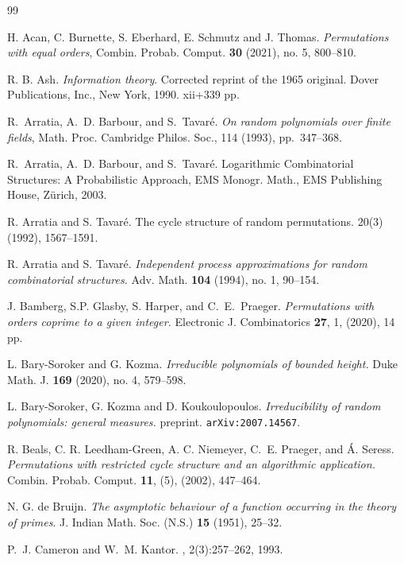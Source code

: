 \documentclass[10pt]{article}
\renewcommand{\(}{\left(}
\renewcommand{\)}{\right)}
\begin{document}
\begin{thebibliography}{99}

{\sc H. Acan, C. Burnette, S. Eberhard, E. Schmutz and J. Thomas}.
\emph{Permutations with equal orders},
Combin. Probab. Comput. {\bf 30} (2021), no. 5, 800--810. 
%

  {\sc R. B. Ash}. \emph{Information theory}.
  Corrected reprint of the 1965 original.
  Dover Publications, Inc., New York, 1990. xii+339 pp.

{\sc R.~Arratia, A.~D. Barbour, and S.~Tavar\'{e}}. {\em On random polynomials
  over finite fields}, Math. Proc. Cambridge Philos. Soc., 114 (1993),
  pp.~347--368.

{\sc R.~Arratia, A.~D. Barbour, and S.~Tavar\'{e}}.
Logarithmic Combinatorial Structures: A Probabilistic Approach, EMS Monogr. Math., EMS Publishing House, Z\" urich, 2003.

{\sc R. Arratia and S. Tavar\'e}.
\newblock The cycle structure of random permutations.
 20(3) (1992), 1567--1591.
%

{\sc R. Arratia and S. Tavar\'e}.
\emph{Independent process approximations for random combinatorial structures.}
Adv. Math. {\bf 104} (1994), no. 1, 90--154. 
%
%

{\sc J. Bamberg, S.P. Glasby, S. Harper, and C.~E.~Praeger}.
\emph{Permutations with orders coprime to a given integer.}
Electronic J. Combinatorics {\bf 27}, 1, (2020), 14 pp.
 
{\sc L. Bary-Soroker and G. Kozma.}
\emph{Irreducible polynomials of bounded height.}
Duke Math. J. {\bf 169} (2020), no. 4, 579--598. 

{\sc L. Bary-Soroker, G. Kozma and D. Koukoulopoulos}.
{\it Irreducibility of random polynomials: general measures.}
preprint. \texttt{arXiv:2007.14567}.

 
 {\sc R. Beals, C. R. Leedham-Green, A. C. Niemeyer, C.~E.
Praeger, and {\' A}. Seress. }
\emph{Permutations with restricted cycle structure and
an algorithmic application.} 
Combin. Probab. Comput. {\bf 11}, (5), (2002), 447--464.
%

{\sc N. G. de Bruijn}.
\emph{The asymptotic behaviour of a function occurring in the theory of primes}.
J. Indian Math. Soc. (N.S.) {\bf 15} (1951), 25--32. 


{\sc P.~J. Cameron and W.~M. Kantor}.
, 2(3):257--262, 1993.


\end{thebibliography}
\end{document}

